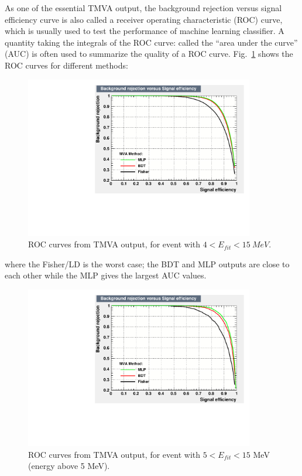 As one of the essential TMVA output, the background rejection versus signal efficiency curve is also called a receiver operating characteristic (ROC) curve, which is usually used to test the performance of machine learning classifier. A quantity taking the integrals of the ROC curve: called the ``area under the curve'' (AUC) is often used to summarize the quality of a ROC curve\cite{murphy2012machine}.  Fig.~\ref{allE_roc} shows the ROC curves for different methods:
\begin{figure}[!htb]
	\centering
	\includegraphics[width=10cm]{ROC_E4to15.pdf}
	\caption{ROC curves from TMVA output, for event with $4<E_{fit}<15~MeV$.}
	\label{allE_roc}
\end{figure}
where the Fisher/LD is the worst case; the BDT and MLP outputs are close to each other while the MLP gives the largest AUC values.

\begin{figure}[!htb]
	\centering
	\includegraphics[width=10cm]{ROC_E5to15.pdf}
	\caption{ROC curves from TMVA output, for event with $5<E_{fit}<15$ MeV (energy above 5 MeV).}
	\label{E5to15_roc}
\end{figure}

